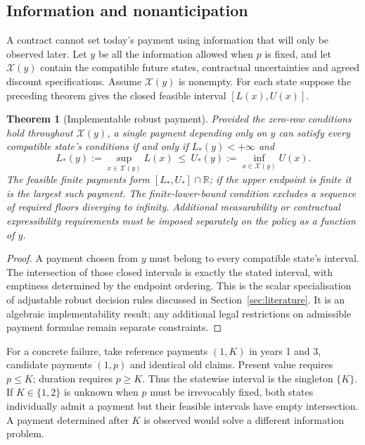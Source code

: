 \documentclass[11pt,a4paper]{article}
\newtheorem{theorem}{Theorem}[section]
\begin{document}
\subsection{Information and nonanticipation}\label{sec:information}
A contract cannot set today's payment using information that will only be observed later. Let $y$ be all the information allowed when $p$ is fixed, and let $\mathcal X(y)$ contain the compatible future states, contractual uncertainties and agreed discount specifications. Assume $\mathcal X(y)$ is nonempty. For each state suppose the preceding theorem gives the closed feasible interval $[L(x),U(x)]$.

\begin{theorem}[Implementable robust payment]\label{thm:information}
Provided the zero-row conditions hold throughout $\mathcal X(y)$, a single payment depending only on $y$ can satisfy every compatible state's conditions if and only if $L_*(y)<+\infty$ and
\begin{equation}
 L_*(y):=\sup_{x\in\mathcal X(y)}L(x)
 \ \leq\
 U_*(y):=\inf_{x\in\mathcal X(y)}U(x).
\end{equation}
The feasible finite payments form $[L_*,U_*]\cap\mathbb R$; if the upper endpoint is finite it is the largest such payment. The finite-lower-bound condition excludes a sequence of required floors diverging to infinity. Additional measurability or contractual expressibility requirements must be imposed separately on the policy as a function of $y$.
\end{theorem}
\begin{proof}
A payment chosen from $y$ must belong to every compatible state's interval. The intersection of those closed intervals is exactly the stated interval, with emptiness determined by the endpoint ordering. This is the scalar specialisation of adjustable robust decision rules discussed in Section~\ref{sec:literature}. It is an algebraic implementability result; any additional legal restrictions on admissible payment formulae remain separate constraints.
\end{proof}
For a concrete failure, take reference payments $(1,K)$ in years 1 and 3, candidate payments $(1,p)$ and identical old claims. Present value requires $p\leq K$; duration requires $p\geq K$. Thus the statewise interval is the singleton $\{K\}$. If $K\in\{1,2\}$ is unknown when $p$ must be irrevocably fixed, both states individually admit a payment but their feasible intervals have empty intersection. A payment determined after $K$ is observed would solve a different information problem.
\end{document}

